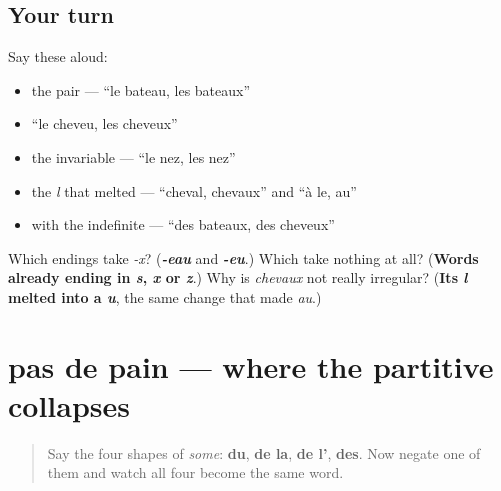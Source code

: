 \subsection*{Your turn}
Say these aloud:

\begin{itemize}
\raggedright
  \item the pair — \textquotedblleft{}le bateau, les bateaux\textquotedblright{}
  \item \textquotedblleft{}le cheveu, les cheveux\textquotedblright{}
  \item the invariable — \textquotedblleft{}le nez, les nez\textquotedblright{}
  \item the \emph{l} that melted — \textquotedblleft{}cheval, chevaux\textquotedblright{} and \textquotedblleft{}à le, au\textquotedblright{}
  \item with the indefinite — \textquotedblleft{}des bateaux, des cheveux\textquotedblright{}
\end{itemize}

\begin{tcolorbox}[breakable,colback=teal!4,colframe=teal!35!black,title={Before you move on}]
Which endings take \emph{-x}? (\emph{\textbf{-eau}} and \emph{\textbf{-eu}}.) Which take nothing at all? (\textbf{Words already ending in \emph{s}, \emph{x} or \emph{z}}.) Why is \emph{chevaux} not really irregular? (\textbf{Its \emph{l} melted into a \emph{u}}, the same change that made \emph{au}.)
\end{tcolorbox}
\section[pas de pain]{pas de pain — where the partitive collapses}

\label{lesson:FR-C38-pas-de}



\begin{quote}
Say the four shapes of \emph{some}: \textbf{du}, \textbf{de la}, \textbf{de l'}, \textbf{des}. Now negate one of them and watch all four become the same word.
\end{quote}

